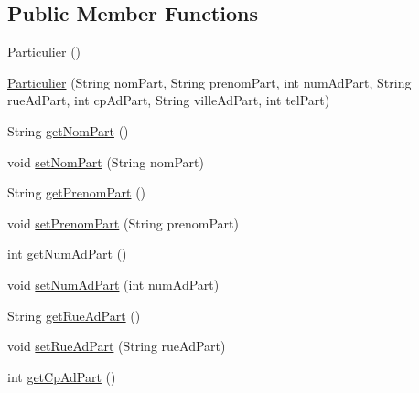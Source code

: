 \subsection*{Public Member Functions}
\begin{DoxyCompactItemize}
\item 
\hyperlink{classcom_1_1ecetech_1_1bti4_1_1itproject_1_1classified_1_1beans_1_1_particulier_ac4f79bbb0c29d5d8a9711509464d0f68}{Particulier} ()
\item 
\hyperlink{classcom_1_1ecetech_1_1bti4_1_1itproject_1_1classified_1_1beans_1_1_particulier_a8ed9662c72a3880c7d8fcb581d8ec4fb}{Particulier} (String nom\+Part, String prenom\+Part, int num\+Ad\+Part, String rue\+Ad\+Part, int cp\+Ad\+Part, String ville\+Ad\+Part, int tel\+Part)
\item 
String \hyperlink{classcom_1_1ecetech_1_1bti4_1_1itproject_1_1classified_1_1beans_1_1_particulier_a34d82b783f84fe9fe06cd96f4ab0a80b}{get\+Nom\+Part} ()
\item 
void \hyperlink{classcom_1_1ecetech_1_1bti4_1_1itproject_1_1classified_1_1beans_1_1_particulier_a5a5605f2236beb96e21b4eec29e4eef9}{set\+Nom\+Part} (String nom\+Part)
\item 
String \hyperlink{classcom_1_1ecetech_1_1bti4_1_1itproject_1_1classified_1_1beans_1_1_particulier_aba8c676696237418160c042621bea09e}{get\+Prenom\+Part} ()
\item 
void \hyperlink{classcom_1_1ecetech_1_1bti4_1_1itproject_1_1classified_1_1beans_1_1_particulier_a5bf2e8ad1237eff45a6a7d90a69bd099}{set\+Prenom\+Part} (String prenom\+Part)
\item 
int \hyperlink{classcom_1_1ecetech_1_1bti4_1_1itproject_1_1classified_1_1beans_1_1_particulier_ada69990d906d44147eb532df67806ca4}{get\+Num\+Ad\+Part} ()
\item 
void \hyperlink{classcom_1_1ecetech_1_1bti4_1_1itproject_1_1classified_1_1beans_1_1_particulier_a6f4dd50f8bea6a51abdb46b6451cd957}{set\+Num\+Ad\+Part} (int num\+Ad\+Part)
\item 
String \hyperlink{classcom_1_1ecetech_1_1bti4_1_1itproject_1_1classified_1_1beans_1_1_particulier_a2a157dcb18e6d6fec1e6905fb752d29f}{get\+Rue\+Ad\+Part} ()
\item 
void \hyperlink{classcom_1_1ecetech_1_1bti4_1_1itproject_1_1classified_1_1beans_1_1_particulier_a8d9ba90aff12f48a9ab59eb37ea9126e}{set\+Rue\+Ad\+Part} (String rue\+Ad\+Part)
\item 
int \hyperlink{classcom_1_1ecetech_1_1bti4_1_1itproject_1_1classified_1_1beans_1_1_particulier_a0b83dce2a8e0197d5ba536e483331ec9}{get\+Cp\+Ad\+Part} ()

\end{DoxyCompactItemize}
